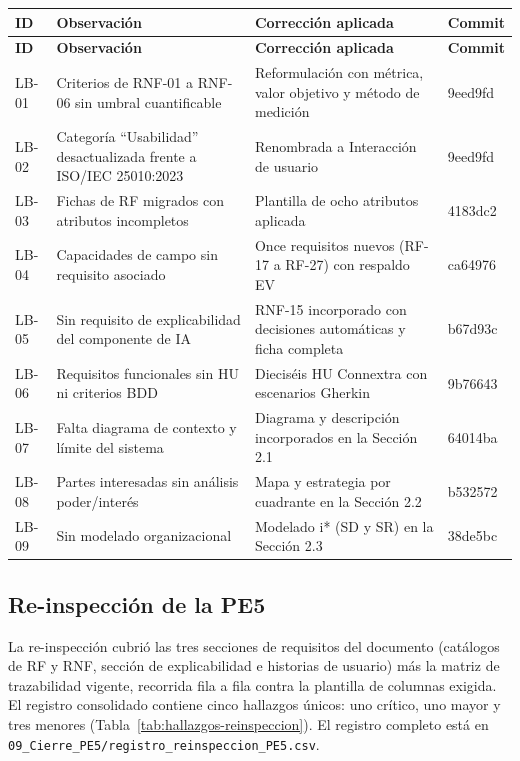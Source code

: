 \begin{center}
\begin{longtable}{|p{1.2cm}|p{4.2cm}|p{5.2cm}|p{2.9cm}|}
\hline
\textbf{ID} & \textbf{Observación} & \textbf{Corrección aplicada} & \textbf{Commit} \\
\hline
\endfirsthead
\hline
\textbf{ID} & \textbf{Observación} & \textbf{Corrección aplicada} & \textbf{Commit} \\
\hline
\endhead
\hline
\endfoot
\hline
\endlastfoot
LB-01 & Criterios de RNF-01 a RNF-06 sin umbral cuantificable & Reformulación con métrica, valor objetivo y método de medición & 9eed9fd \\
\hline
LB-02 & Categoría ``Usabilidad'' desactualizada frente a ISO/IEC 25010:2023 & Renombrada a Interacción de usuario & 9eed9fd \\
\hline
LB-03 & Fichas de RF migrados con atributos incompletos & Plantilla de ocho atributos aplicada & 4183dc2 \\
\hline
LB-04 & Capacidades de campo sin requisito asociado & Once requisitos nuevos (RF-17 a RF-27) con respaldo EV & ca64976 \\
\hline
LB-05 & Sin requisito de explicabilidad del componente de IA & RNF-15 incorporado con decisiones automáticas y ficha completa & b67d93c \\
\hline
LB-06 & Requisitos funcionales sin HU ni criterios BDD & Dieciséis HU Connextra con escenarios Gherkin & 9b76643 \\
\hline
LB-07 & Falta diagrama de contexto y límite del sistema & Diagrama y descripción incorporados en la Sección 2.1 & 64014ba \\
\hline
LB-08 & Partes interesadas sin análisis poder/interés & Mapa y estrategia por cuadrante en la Sección 2.2 & b532572 \\
\hline
LB-09 & Sin modelado organizacional & Modelado i* (SD y SR) en la Sección 2.3 & 38de5bc \\
\hline
\end{longtable}
\label{tab:correcciones-baseline}
\end{center}

\subsection{Re-inspección de la PE5}
\label{sec:reinspeccion-pe5}

La re-inspección cubrió las tres secciones de requisitos del documento (catálogos de RF y RNF, sección de explicabilidad e historias de usuario) más la matriz de trazabilidad vigente, recorrida fila a fila contra la plantilla de columnas exigida. El registro consolidado contiene cinco hallazgos únicos: uno crítico, uno mayor y tres menores (Tabla~\ref{tab:hallazgos-reinspeccion}). El registro completo está en \texttt{09\_Cierre\_PE5/registro\_reinspeccion\_PE5.csv}.


